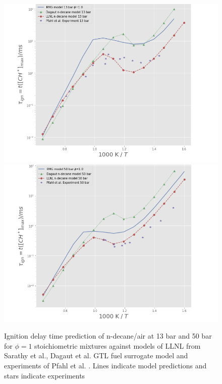 \begin{figure}[!hbp]
    \centering
    \includegraphics[scale=0.4, keepaspectratio]{images/idt_nc10_13bar.png}
    \includegraphics[scale=0.4, keepaspectratio]{images/idt_nc10_50bar.png}
    \caption{Ignition delay time prediction of n-decane/air at 13 bar and 50 bar for $\phi=1$ stoichiometric mixtures against models of LLNL from Sarathy et al.\cite{Sarathy2011ComprehensiveC20}, Dagaut et al. GTL fuel surrogate model \cite{Dagaut2014} and experiments of Pfahl et al. \cite{Pfahl1996Self-ignitionConditions}. Lines indicate model predictions and stars indicate experiments}
    \label{fig:idt times}
\end{figure}

\cleardoublepage

